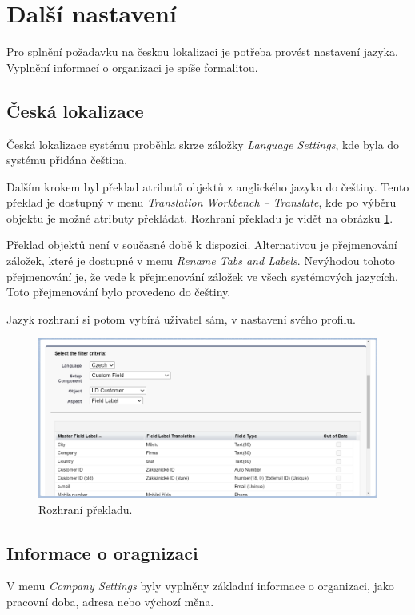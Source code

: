 \section{Další nastavení}
Pro splnění požadavku na českou lokalizaci je potřeba provést nastavení jazyka. Vyplnění informací o organizaci je spíše formalitou.
\subsection{Česká lokalizace}
Česká lokalizace systému proběhla skrze záložky \emph{Language Settings}, kde byla do systému přidána čeština. 

Dalším krokem byl překlad atributů objektů z anglického jazyka do češtiny. Tento překlad je dostupný v menu \emph{Translation Workbench -- Translate}, kde po výběru objektu je možné atributy překládat. Rozhraní překladu je vidět na obrázku \ref{fig:Translation}.

Překlad objektů není v současné době k dispozici. Alternativou je přejmenování záložek, které je dostupné v menu \emph{Rename Tabs and Labels}. Nevýhodou tohoto přejmenování je, že vede k přejmenování záložek ve všech systémových jazycích. Toto přejmenování bylo provedeno do češtiny.

Jazyk rozhraní si potom vybírá uživatel sám, v nastavení svého profilu.

\begin{figure}[h!]
    \centering
    \includegraphics[width=\textwidth]{assets/7_implementace/finální_nastavení/překlad.png}
    \caption{Rozhraní překladu.}
    \label{fig:Translation}
\end{figure}
\FloatBarrier

\subsection{Informace o oragnizaci}
V menu \emph{Company Settings} byly vyplněny základní informace o organizaci, jako pracovní doba, adresa nebo výchozí měna.